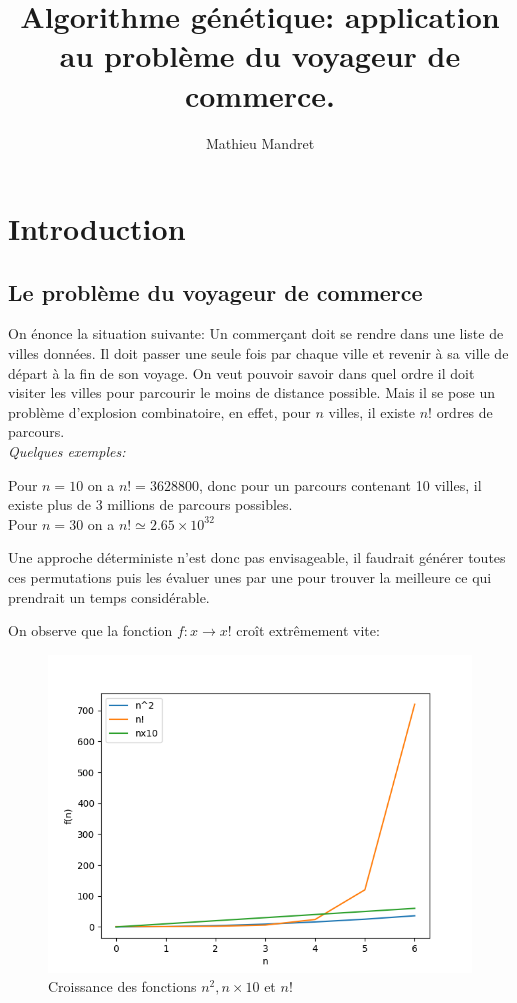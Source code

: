\documentclass[11pt]{article}
\author{Mathieu Mandret}
\date{}
\title{Algorithme génétique: application au problème du voyageur de commerce.}
\begin{document}
\begin{titlepage}
\maketitle
\end{titlepage}
\tableofcontents
\clearpage
\section{Introduction}
\label{sec-1}
\subsection{Le problème du voyageur de commerce}
\label{sec-1-1}
On énonce la situation suivante:
Un commerçant doit se rendre dans une liste de villes données. Il doit passer une seule fois par chaque ville
et revenir à sa ville de départ à la fin de son voyage.
On veut pouvoir savoir dans quel ordre il doit visiter les villes pour parcourir le moins de distance possible.
Mais il se pose un problème d'explosion combinatoire, en effet, pour $n$ villes, il existe $n!$ ordres de parcours. \\
\emph{Quelques exemples:} 

Pour $n = 10$ on a $n! = 3628800$, donc pour un parcours contenant 10 villes, il existe plus de 3 millions de parcours possibles. \\

Pour $n = 30$ on a $n! \simeq 2.65 \times 10^{32}$

Une approche déterministe n'est donc pas envisageable, il faudrait générer toutes ces permutations puis les évaluer unes
par une pour trouver la meilleure ce qui prendrait un temps considérable. 

On observe que la fonction $f: x \rightarrow x!$ croît extrêmement vite:

\begin{figure}[H]
\centering
\includegraphics[width=.9\linewidth]{./complexite.png}
\caption{Croissance des fonctions $n^2, n \times 10$ et $n!$}
\end{figure}
\end{document}
